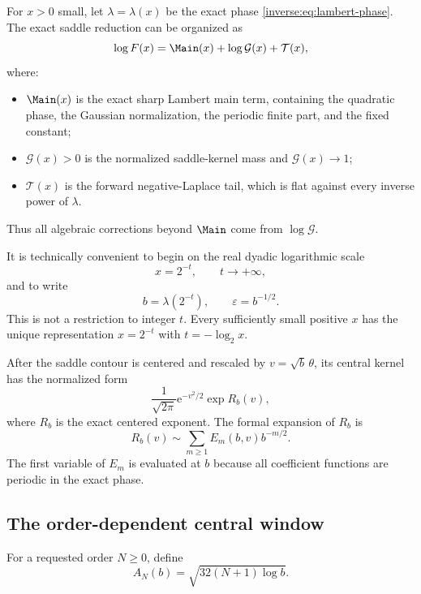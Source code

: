 \documentclass[11pt,oneside]{article}
\theoremstyle{definition}
\theoremstyle{remark}
\newcommand{\e}{\mathrm e}
\begin{document}
For $x>0$ small, let $\lambda=\lambda(x)$ be the exact phase
\eqref{inverse:eq:lambert-phase}.  The exact saddle reduction can be organized as
\begin{equation}
 \log F(x)
 =\Main(x)+\log\mathcal G(x)+\mathcal T(x),
 \label{inverse:eq:exact-saddle-reduction}
\end{equation}
where:
\begin{itemize}
\item $\Main(x)$ is the exact sharp Lambert main term, containing the
quadratic phase, the Gaussian normalization, the periodic finite part, and
the fixed constant;
\item $\mathcal G(x)>0$ is the normalized saddle-kernel mass and
$\mathcal G(x)\to1$;
\item $\mathcal T(x)$ is the forward negative-Laplace tail, which is flat
against every inverse power of $\lambda$.
\end{itemize}
Thus all algebraic corrections beyond $\Main$ come from $\log\mathcal G$.

It is technically convenient to begin on the real dyadic logarithmic
scale
\[
 x=2^{-t},\qquad t\to+\infty,
\]
and to write
\[
 b=\lambda(2^{-t}),\qquad \varepsilon=b^{-1/2}.
\]
This is not a restriction to integer $t$.  Every sufficiently small
positive $x$ has the unique representation $x=2^{-t}$ with
$t=-\log_2x$.

After the saddle contour is centered and rescaled by
$v=\sqrt b\,\theta$, its central kernel has the normalized form
\begin{equation}
 \frac1{\sqrt{2\pi}}\e^{-v^2/2}
 \exp R_b(v), \label{inverse:eq:normalized-central-kernel}
\end{equation}
where $R_b$ is the exact centered exponent.  The formal expansion of
$R_b$ is
\begin{equation}
 R_b(v)\sim\sum_{m\geq1}E_m(b,v)b^{-m/2}.
 \label{inverse:eq:R-formal}
\end{equation}
The first variable of $E_m$ is evaluated at $b$ because all coefficient
functions are periodic in the exact phase.

\subsection{The order-dependent central window}

For a requested order $N\geq0$, define
\begin{equation}
 A_N(b)=\sqrt{32(N+1)\log b}. \label{inverse:eq:central-radius}
\end{equation}
\end{document}
